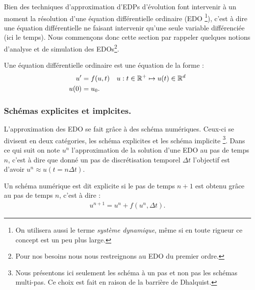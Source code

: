 Bien des techniques d'approximation d'EDPs d'évolution font intervenir à un moment la résolution d'une équation différentielle ordinaire (EDO
\footnote{On utilisera aussi le terme \textit{système dynamique}, même si en toute rigueur ce concept est un peu plus large.}),
c'est à dire une équation différentielle ne faisant intervenir qu'une seule variable différenciée (ici le temps). Nous commençons donc cette section par rappeler 
quelques notions d'analyse et de simulation des EDOs\footnote{Pour nos besoins nous nous restreignons au EDO du premier ordre.}.\par

\begin{definition}
    Une équation différentielle ordinaire est une équation de la forme :
    \begin{align}
        u' &= f(u,t)\quad u : t \in \mathbb{R}^+ \mapsto u(t) \in \mathbb{R}^d\\\notag
        u(0)&=u_0.
    \end{align}
\end{definition}
\subsubsection{Schémas explicites et implcites.}
L'approximation des EDO se fait grâce à des schéma numériques. Ceux-ci se divisent en deux catégories, les schéma explicites et les schéma implicite
\footnote{Nous présentons ici seulement les schéma à un pas et non pas les schémas multi-pas. Ce choix est fait en raison de la barrière de Dhalquist.}.
Dans ce qui suit on note $u^n$ l'approximation de la solution d'une EDO au pas de temps $n$, c'est à dire que donné un pas de discrétisation temporel $\Delta t$
l'objectif est d'avoir $u^n \approx u(t=n\Delta t)$.

\begin{definition}
    Un schéma numérique est dit explicite si le pas de temps $n+1$ est obtenu grâce au pas de temps $n$, c'est à dire : 
    \begin{align}
        u^{n+1} = u^n + f(u^n ,\Delta t ).
    \end{align}
\end{definition}

